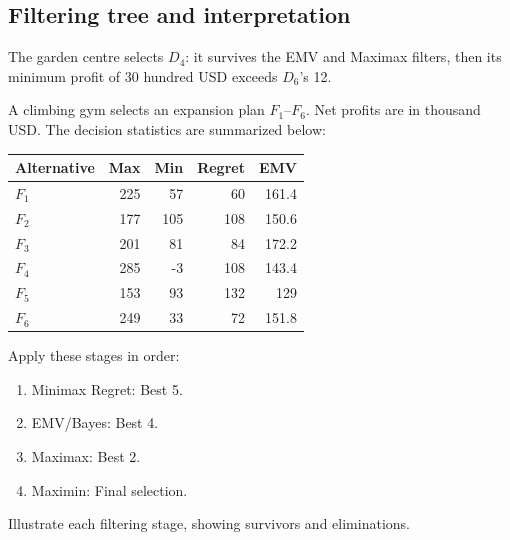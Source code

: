 \subsection*{Filtering tree and interpretation}
\begin{center}
\end{center}
The garden centre selects $D_4$: it survives the EMV and Maximax filters, then its minimum profit of 30 hundred USD exceeds $D_6$'s 12.
\secInicio[sec:q3]

A climbing gym selects an expansion plan $F_1$--$F_6$. Net profits are in thousand USD. The decision statistics are summarized below:
\vspace{-3mm}
\begin{center}\small\setlength{\tabcolsep}{4pt}
	\begin{tabular}{lrrrr}\toprule
		Alternative & Max & Min & Regret & EMV\\ \midrule
		$F_1$ & 225 & 57 & 60 & 161.4\\
		$F_2$ & 177 & 105 & 108 & 150.6\\
		$F_3$ & 201 & 81 & 84 & 172.2\\
		$F_4$ & 285 & -3 & 108 & 143.4\\
		$F_5$ & 153 & 93 & 132 & 129\\
		$F_6$ & 249 & 33 & 72 & 151.8\\
		\bottomrule
	\end{tabular}
\end{center}
\vspace{-3mm}
Apply these stages in order:
\begin{enumerate}[leftmargin=*]
	\item Minimax Regret: Best 5.
	\item EMV/Bayes: Best 4.
	\item Maximax: Best 2.
	\item Maximin: Final selection.
\end{enumerate}
Illustrate each filtering stage, showing survivors and eliminations.
\label{sol:q4table}
